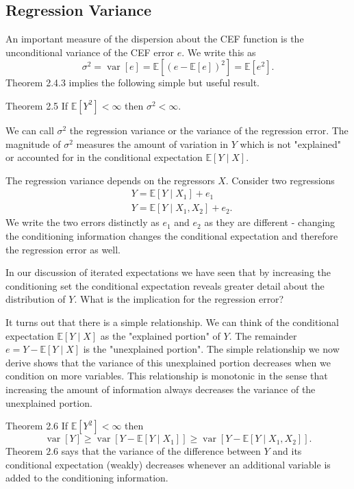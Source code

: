 \documentclass[10pt]{article}
\begin{document}
\subsection{Regression Variance}
An important measure of the dispersion about the CEF function is the unconditional variance of the CEF error $e$. We write this as
$$
\sigma^{2}=\operatorname{var}[e]=\mathbb{E}\left[(e-\mathbb{E}[e])^{2}\right]=\mathbb{E}\left[e^{2}\right] .
$$
Theorem 2.4.3 implies the following simple but useful result.

Theorem 2.5 If $\mathbb{E}\left[Y^{2}\right]<\infty$ then $\sigma^{2}<\infty$.

We can call $\sigma^{2}$ the regression variance or the variance of the regression error. The magnitude of $\sigma^{2}$ measures the amount of variation in $Y$ which is not "explained" or accounted for in the conditional expectation $\mathbb{E}[Y \mid X]$.

The regression variance depends on the regressors $X$. Consider two regressions
$$
\begin{aligned}
&Y=\mathbb{E}\left[Y \mid X_{1}\right]+e_{1} \\
&Y=\mathbb{E}\left[Y \mid X_{1}, X_{2}\right]+e_{2} .
\end{aligned}
$$
We write the two errors distinctly as $e_{1}$ and $e_{2}$ as they are different - changing the conditioning information changes the conditional expectation and therefore the regression error as well.

In our discussion of iterated expectations we have seen that by increasing the conditioning set the conditional expectation reveals greater detail about the distribution of $Y$. What is the implication for the regression error?

It turns out that there is a simple relationship. We can think of the conditional expectation $\mathbb{E}[Y \mid X]$ as the "explained portion" of $Y$. The remainder $e=Y-\mathbb{E}[Y \mid X]$ is the "unexplained portion". The simple relationship we now derive shows that the variance of this unexplained portion decreases when we condition on more variables. This relationship is monotonic in the sense that increasing the amount of information always decreases the variance of the unexplained portion.

Theorem 2.6 If $\mathbb{E}\left[Y^{2}\right]<\infty$ then
$$
\operatorname{var}[Y] \geq \operatorname{var}\left[Y-\mathbb{E}\left[Y \mid X_{1}\right]\right] \geq \operatorname{var}\left[Y-\mathbb{E}\left[Y \mid X_{1}, X_{2}\right]\right] .
$$
Theorem $2.6$ says that the variance of the difference between $Y$ and its conditional expectation (weakly) decreases whenever an additional variable is added to the conditioning information.
\end{document}
